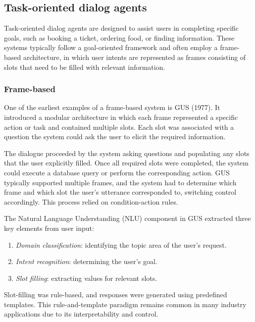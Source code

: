 \subsection{Task-oriented dialog agents}
Task-oriented dialog agents are designed to assist users in completing specific goals, such as booking a ticket, ordering food, or finding information. 
These systems typically follow a goal-oriented framework and often employ a frame-based architecture, in which user intents are represented as frames consisting of slots that need to be filled with relevant information.

\subsubsection{Frame-based}
One of the earliest examples of a frame-based system is GUS (1977). 
It introduced a modular architecture in which each frame represented a specific action or task and contained multiple slots. 
Each slot was associated with a question the system could ask the user to elicit the required information.

The dialogue proceeded by the system asking questions and populating any slots that the user explicitly filled.
Once all required slots were completed, the system could execute a database query or perform the corresponding action. 
GUS typically supported multiple frames, and the system had to determine which frame and which slot the user's utterance corresponded to, switching control accordingly. 
This process relied on condition-action rules.

The Natural Language Understanding (NLU) component in GUS extracted three key elements from user input:
\begin{enumerate}
    \item \textit{Domain classification}: identifying the topic area of the user's request.
    \item \textit{Intent recognition}: determining the user's goal.
    \item \textit{Slot filling}: extracting values for relevant slots.
\end{enumerate}
\noindent Slot-filling was rule-based, and responses were generated using predefined templates. 
This rule-and-template paradigm remains common in many industry applications due to its interpretability and control.


